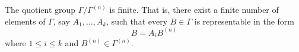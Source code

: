 The quotient group $\Gamma/\Gamma^{(n)}$ is finite. That is, there exist a finite number of elements of $\Gamma$, say $A_1, \ldots, A_k$, such that every $B \in \Gamma$ is representable in the form
$$B = A_i B^{(n)}$$
where $1 \leq i \leq k$ and $B^{(n)} \in \Gamma^{(n)}$.
